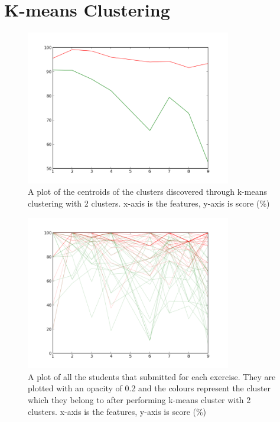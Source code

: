 \chapter{K-means Clustering}

\begin{figure}[h!]
\centering
\includegraphics[width=0.8\textwidth]{images/kmeans_2_centers.png}
\caption{A plot of the centroids of the clusters discovered through k-means clustering with 2 clusters. x-axis is the features, y-axis is score (\%)}
\label{fig:kmeans_2_centers}
\end{figure}

\begin{figure}[h!]
\centering
\includegraphics[width=0.8\textwidth]{images/kmeans_2.png}
\caption{A plot of all the students that submitted for each exercise. They are plotted with an opacity of 0.2 and the colours represent the cluster which they belong to after performing k-means cluster with 2 clusters. x-axis is the features, y-axis is score (\%)}
\label{fig:kmeans_2}
\end{figure}

